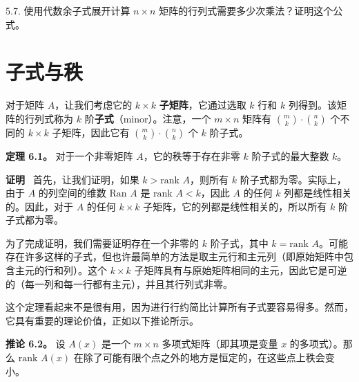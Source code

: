 5.7. 使用代数余子式展开计算 $n \times n$ 矩阵的行列式需要多少次乘法？证明这个公式。


\section{子式与秩}

对于矩阵 $A$，让我们考虑它的 $k \times k$ \textbf{子矩阵}，它通过选取 $k$ 行和 $k$ 列得到。该矩阵的行列式称为 $k$ 阶\textbf{子式}（minor）。注意，一个 $m \times n$ 矩阵有 $\binom{m}{k} \cdot \binom{n}{k}$ 个不同的 $k \times k$ 子矩阵，因此它有 $\binom{m}{k} \cdot \binom{n}{k}$ 个 $k$ 阶子式。

\textbf{定理 6.1。} 对于一个非零矩阵 $A$，它的秩等于存在非零 $k$ 阶子式的最大整数 $k$。

\textbf{证明}~ 首先，让我们证明，如果 $k > \text{rank } A$，则所有 $k$ 阶子式都为零。实际上，由于 $A$ 的列空间的维数 $\text{Ran } A$ 是 $\text{rank } A < k$，因此 $A$ 的任何 $k$ 列都是线性相关的。因此，对于 $A$ 的任何 $k \times k$ 子矩阵，它的列都是线性相关的，所以所有 $k$ 阶子式都为零。

为了完成证明，我们需要证明存在一个非零的 $k$ 阶子式，其中 $k = \text{rank } A$。可能存在许多这样的子式，但也许最简单的方法是取主元行和主元列（即原始矩阵中包含主元的行和列）。这个 $k \times k$ 子矩阵具有与原始矩阵相同的主元，因此它是可逆的（每一列和每一行都有主元），并且其行列式非零。

这个定理看起来不是很有用，因为进行行约简比计算所有子式要容易得多。然而，它具有重要的理论价值，正如以下推论所示。

\textbf{推论 6.2。} 设 $A(x)$ 是一个 $m \times n$ 多项式矩阵（即其项是变量 $x$ 的多项式）。那么 $\text{rank } A(x)$ 在除了可能有限个点之外的地方是恒定的，在这些点上秩会变小。







